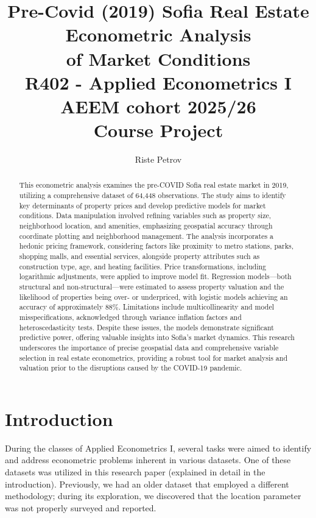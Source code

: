 \documentclass[]{article}
\title{Pre-Covid (2019) Sofia Real Estate \\ 
	Econometric Analysis \\
	 of Market Conditions \\
	  R402 - Applied Econometrics I \\ AEEM cohort 2025/26 \\ Course Project}
\author{Riste Petrov}
\begin{document}
\maketitle

\begin{abstract}
	This econometric analysis examines the pre-COVID Sofia real estate market in 2019, utilizing a comprehensive dataset of 64,448 observations. The study aims to identify key determinants of property prices and develop predictive models for market conditions. Data manipulation involved refining variables such as property size, neighborhood location, and amenities, emphasizing geospatial accuracy through coordinate plotting and neighborhood management. The analysis incorporates a hedonic pricing framework, considering factors like proximity to metro stations, parks, shopping malls, and essential services, alongside property attributes such as construction type, age, and heating facilities. Price transformations, including logarithmic adjustments, were applied to improve model fit. Regression models—both structural and non-structural—were estimated to assess property valuation and the likelihood of properties being over- or underpriced, with logistic models achieving an accuracy of approximately 88\%. Limitations include multicollinearity and model misspecifications, acknowledged through variance inflation factors and heteroscedasticity tests. Despite these issues, the models demonstrate significant predictive power, offering valuable insights into Sofia’s market dynamics. This research underscores the importance of precise geospatial data and comprehensive variable selection in real estate econometrics, providing a robust tool for market analysis and valuation prior to the disruptions caused by the COVID-19 pandemic.
\end{abstract}
\vspace{2em}
\tableofcontents
\newpage
\section{Introduction}

During the classes of Applied Econometrics I, several tasks were aimed to identify and address econometric problems inherent in various datasets. One of these datasets was utilized in this research paper (explained in detail in the introduction). Previously, we had an older dataset that employed a different methodology; during its exploration, we discovered that the location parameter was not properly surveyed and reported.\\
\end{document}

